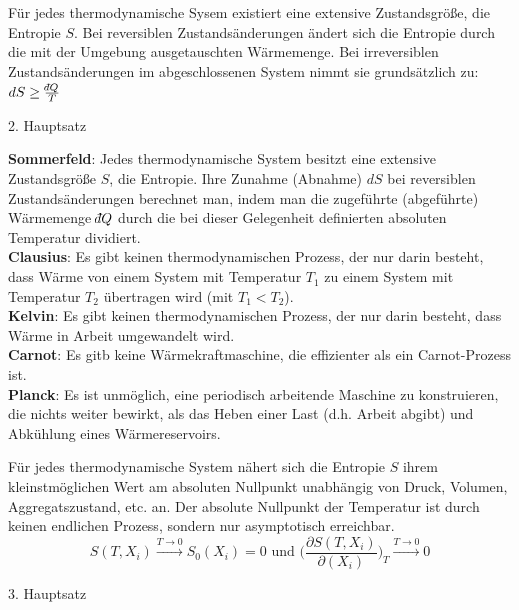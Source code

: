 \documentclass[12pt,a4paper, twoside]{article}
\renewcommand{\=}[1]{\stackrel{#1}{=}}
\def\dbar{{\mathchar'26\mkern-12mu d}}
\def\dbar{{\mathchar'26\mkern-12mu d}}
\theoremstyle{definition}
\theoremstyle{remark}
\begin{document}
\begin{center}
\begin{framed} \noindent Für jedes thermodynamische Sysem existiert eine extensive Zustandsgröße, die Entropie $S$. Bei reversiblen Zustandsänderungen ändert sich die Entropie durch die mit der Umgebung ausgetauschten Wärmemenge. Bei irreversiblen Zustandsänderungen im abgeschlossenen System nimmt sie grundsätzlich zu: $dS \geq \frac{\dbar Q}{T}$
\begin{center} 2. Hauptsatz\end{center}\end{framed}
\end{center}

\begin{center}
\begin{framed}
\noindent \textbf{Sommerfeld}: Jedes thermodynamische System besitzt eine extensive Zustandsgröße $S$, die Entropie. Ihre Zunahme (Abnahme) $dS$ bei reversiblen Zustandsänderungen berechnet man, indem man die zugeführte (abgeführte) Wärmemenge $\dbar Q$ durch die bei dieser Gelegenheit definierten absoluten Temperatur dividiert.\\
\noindent \textbf{Clausius}: Es gibt keinen thermodynamischen Prozess, der nur darin besteht, dass Wärme von einem System mit Temperatur $T_1$ zu einem System mit Temperatur $T_2$ übertragen wird (mit $T_1 < T_2$).\\
\noindent \textbf{Kelvin}: Es gibt keinen thermodynamischen Prozess, der nur darin besteht, dass Wärme in Arbeit umgewandelt wird.\\
\noindent \textbf{Carnot}: Es gitb keine Wärmekraftmaschine, die effizienter als ein Carnot-Prozess ist.\\
\noindent \textbf{Planck}: Es ist unmöglich, eine periodisch arbeitende Maschine zu konstruieren, die nichts weiter bewirkt, als das Heben einer Last (d.h. Arbeit abgibt) und Abkühlung eines Wärmereservoirs.
\end{framed}
\end{center}

\begin{center}
\begin{framed} \noindent Für jedes thermodynamische System nähert sich die Entropie $S$ ihrem kleinstmöglichen Wert am absoluten Nullpunkt unabhängig von Druck, Volumen, Aggregatszustand, etc. an.
Der absolute Nullpunkt der Temperatur ist durch keinen endlichen Prozess, sondern nur asymptotisch erreichbar.
$$S(T,X_i) \xrightarrow{T \rightarrow 0} S_0(X_i) = 0 \text{ und } \Big(\frac{\partial S(T,X_i)}{\partial(X_i)}\Big)_T \xrightarrow{T \rightarrow 0} 0$$
\begin{center} 3. Hauptsatz\end{center}\end{framed}
\end{center}
\end{document}
